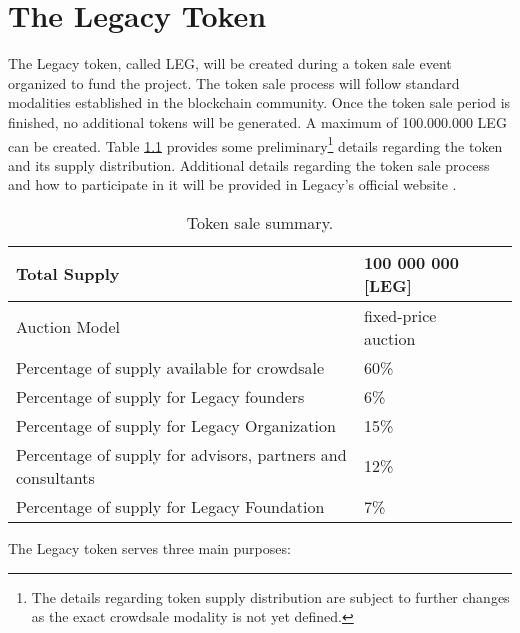 \chapter{The Legacy Token} %
\label{cha:the_legacy_token}

The Legacy token, called LEG, will be created during a token sale event organized to fund the project. The token sale process will follow standard modalities established in the blockchain community. Once the token sale period is finished, no additional tokens will be generated. A maximum of 100.000.000 LEG can be created. 
Table \ref{table:ico_summary} provides some preliminary\footnote{The details regarding token supply distribution are subject to further changes as the exact crowdsale modality is not yet defined.} details regarding the token and its supply distribution. Additional details regarding the token sale process and how to participate in it will be provided in Legacy's official website \cite{Legacy}.

\begin{table}[h]
	\begin{center}		
		{\renewcommand{\arraystretch}{1.3}			
			\begin{tabular}{| l | p{5cm} | p{3.5cm}  |}	
		    \hline			    
		    	Total Supply		&  100 000 000 [LEG]  \\ \hline %
		    	Auction Model       &  fixed-price auction\tablefootnote{To be confirmed.} \\ \hline														
				Percentage of supply available for crowdsale & 60\% \\ \hline
				Percentage of supply for Legacy founders     &  6\% \\ \hline
				Percentage of supply for Legacy Organization & 15\% \\ \hline
				Percentage of supply for advisors, partners and consultants & 12\% \\ \hline
				Percentage of supply for Legacy Foundation & 7\% \\	\hline	
			\end{tabular}				
		}
	\caption{Token sale summary.}
	\label{table:ico_summary}		
	\end{center}
\end{table}



The Legacy token serves three main purposes:

